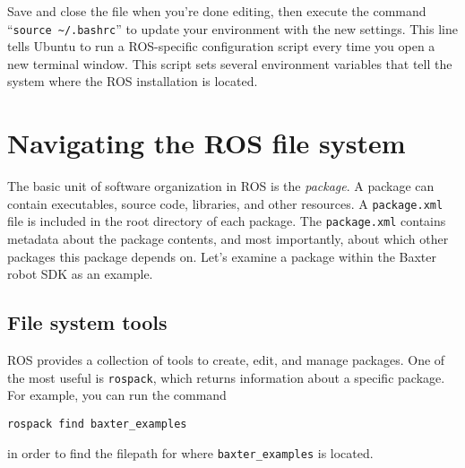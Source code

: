\documentclass{article}
\begin{document}
Save and close the file when you're done editing, then execute the command ``\verb=source ~/.bashrc='' to update your environment with the new settings. This line tells Ubuntu to run a ROS-specific configuration script every time you open a new terminal window. This script sets several environment variables that tell the system where the ROS installation is located.


\section{Navigating the ROS file system}

The basic unit of software organization in ROS is the \emph{package}. A package can contain executables, source code, libraries, and other resources. A \verb=package.xml= file is included in the root directory of each package. The \verb=package.xml= contains metadata about the package contents, and most importantly, about which other packages this package depends on. Let's examine a package within the Baxter robot SDK as an example.

\subsection{File system tools}
ROS provides a collection of tools to create, edit, and manage packages. One of the most useful is \verb=rospack=, which returns information about a specific package. For example, you can run the command
\begin{Verbatim}[frame=single]
rospack find baxter_examples
\end{Verbatim}
in order to find the filepath for where \verb=baxter_examples= is located.
\end{document}
